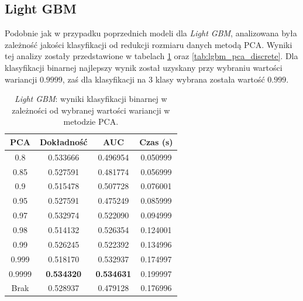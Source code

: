 \documentclass[a4paper, twoside, 11pt, openright]{article}
\begin{document}
\subsection{Light GBM}

Podobnie jak w przypadku poprzednich modeli dla \textit{Light GBM}, analizowana była zależność jakości klasyfikacji od redukcji rozmiaru danych metodą PCA. Wyniki tej analizy zostały przedstawione w tabelach \ref{tab:lgbm_pca_binary} oraz \ref{tab:lgbm_pca_discrete}. Dla klasyfikacji binarnej najlepszy wynik został uzyskany przy wybraniu wartości wariancji $0.9999$, zaś dla klasyfikacji na 3 klasy wybrana została wartość $0.999$.	

\begin{table}[H]
    \centering
    \begin{tabular}{|c|c|c|c|}
    \hline
        \textbf{PCA} & \textbf{Dokładność} & \textbf{AUC} & \textbf{Czas (s)} \\ \hline
0.8                &  0.533666 &  0.496954 &    0.050999 \\ \hline
0.85               &  0.527591 &  0.481774 &    0.056999 \\ \hline
0.9                &  0.515478 &  0.507728 &    0.076001 \\ \hline
0.95               &  0.527591 &  0.475249 &    0.085999 \\ \hline
0.97               &  0.532974 &  0.522090 &    0.094999 \\ \hline
0.98               &  0.514132 &  0.526354 &    0.124001 \\ \hline
0.99               &  0.526245 &  0.522392 &    0.134996 \\ \hline
0.999			   &  0.518170 &  0.532937 &    0.174997 \\ \hline
0.9999             &  \textbf{0.534320} &  \textbf{0.534631} &    0.199997 \\ \hline
Brak                &  0.528937 &  0.479128 &    0.176996 \\ \hline
    \end{tabular}
    \caption{\textit{Light GBM}: wyniki klasyfikacji binarnej w zależności od wybranej wartości wariancji w metodzie PCA.}
    \label{tab:lgbm_pca_binary}
\end{table}
\end{document}
